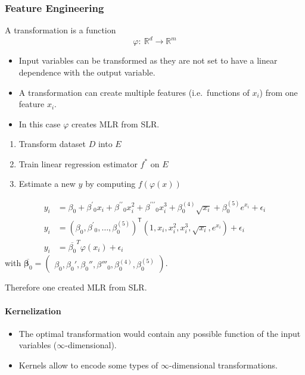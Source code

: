 \subsubsection{Feature Engineering}

A transformation is a function
\begin{equation*}
    \varphi{:}\:\mathbb{R}^d\to\mathbb{R}^m
\end{equation*}

\begin{itemize}
    \item Input variables can be transformed as they are not set to have a linear dependence with the output variable.
    \item A transformation can create multiple features (i.e.\ functions of $x_i$) from one feature $x_i$.
    \item In this case $\varphi$ creates MLR from SLR.
\end{itemize}


\begin{enumerate}
    \item Transform dataset $D$ into $E$
    \item Train linear regression estimator $f^*$ on $E$
    \item Estimate a new $y$ by computing $f(\varphi(x))$
\end{enumerate}


\noindent\begin{align*}
    y_i & =\beta_0+\beta^{\prime}{}_0x_i+\beta^{\prime\prime}{}_0x_i^2+\beta^{\prime\prime\prime}{}_0x_i^3+\beta_0^{(4)}\sqrt{x_i}+\beta_0^{(5)}e^{x_i}+\epsilon_i \\
    y_i & ={\left(\beta_0,\beta^{\prime}{}_0,\dots,\beta_0^{(5)}\right)}^{\mathsf{T}}\left(1,x_i,x_i^2,x_i^3,\sqrt{x_i},e^{x_i}\right)+\epsilon_i                  \\
    y_i & =\overline{\beta_0}^T\varphi(x_i)+\epsilon_i
\end{align*}
with $\overline{\boldsymbol{\beta}_0}=\begin{pmatrix}\beta_0,\beta_0',\beta_0'',\beta'''_0,\beta_0^{(4)},\beta_0^{(5)}\end{pmatrix}$. %

Therefore one created MLR from SLR. 

\paragraph{Kernelization}
\begin{itemize}
    \item The optimal transformation would contain any possible function of the input variables ($\infty$-dimensional).
    \item Kernels allow to encode some types of $\infty$-dimensional transformations.
\end{itemize}

